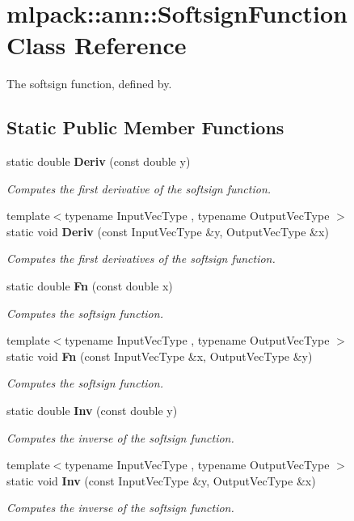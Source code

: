 \section{mlpack\+:\+:ann\+:\+:Softsign\+Function Class Reference}
\label{classmlpack_1_1ann_1_1SoftsignFunction}


The softsign function, defined by.  


\subsection*{Static Public Member Functions}
\begin{DoxyCompactItemize}
\item 
static double {\bf Deriv} (const double y)
\begin{DoxyCompactList}\small\item\em Computes the first derivative of the softsign function. \end{DoxyCompactList}\item 
{\footnotesize template$<$typename Input\+Vec\+Type , typename Output\+Vec\+Type $>$ }\\static void {\bf Deriv} (const Input\+Vec\+Type \&y, Output\+Vec\+Type \&x)
\begin{DoxyCompactList}\small\item\em Computes the first derivatives of the softsign function. \end{DoxyCompactList}\item 
static double {\bf Fn} (const double x)
\begin{DoxyCompactList}\small\item\em Computes the softsign function. \end{DoxyCompactList}\item 
{\footnotesize template$<$typename Input\+Vec\+Type , typename Output\+Vec\+Type $>$ }\\static void {\bf Fn} (const Input\+Vec\+Type \&x, Output\+Vec\+Type \&y)
\begin{DoxyCompactList}\small\item\em Computes the softsign function. \end{DoxyCompactList}\item 
static double {\bf Inv} (const double y)
\begin{DoxyCompactList}\small\item\em Computes the inverse of the softsign function. \end{DoxyCompactList}\item 
{\footnotesize template$<$typename Input\+Vec\+Type , typename Output\+Vec\+Type $>$ }\\static void {\bf Inv} (const Input\+Vec\+Type \&y, Output\+Vec\+Type \&x)
\begin{DoxyCompactList}\small\item\em Computes the inverse of the softsign function. \end{DoxyCompactList}\end{DoxyCompactItemize}


